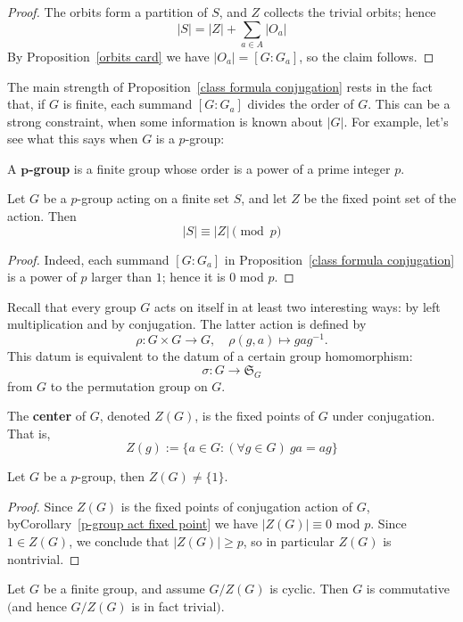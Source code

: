 \begin{proof}
The orbits form a partition of $S$, and $Z$ collects the trivial orbits; hence
\[|S|=|Z|+\sum_{a\in A}|O_a|\]
By Proposition~\ref{orbits card} we have $|O_a|=[G:G_a]$, so the claim follows.
\end{proof}
The main strength of Proposition~\ref{class formula conjugation} rests in the fact that, if $G$ is finite, each summand $[G:G_a]$ divides the order of $G$. This can be a strong constraint, when some information is known about $|G|$. For example, let's see what this says when $G$ is a $p$-group:
\begin{definition}
A \textbf{$\bm{p}$-group} is a finite group whose order is a power of a prime integer $p$.
\end{definition}
\begin{corollary}\label{p-group act fixed point}
Let $G$ be a $p$-group acting on a finite set $S$, and let $Z$ be the fixed
point set of the action. Then
\[|S|\equiv|Z|\pmod{p}\]
\end{corollary}
\begin{proof}
Indeed, each summand $[G:G_a]$ in Proposition~\ref{class formula conjugation} is a power of $p$ larger than $1$; hence it is $0$ mod $p$.
\end{proof}
Recall that every group $G$ acts on itself in at least two interesting ways: by left multiplication and by conjugation. The latter action is defined by
\[\rho:G\times G\to G,\quad \rho(g,a)\mapsto gag^{-1}.\]
This datum is equivalent to the datum of a certain group homomorphism:
\[\sigma:G\to\mathfrak{S}_G\]
from $G$ to the permutation group on $G$.
\begin{definition}
The \textbf{center} of $G$, denoted $Z(G)$, is the fixed points of $G$ under conjugation. That is,
\[Z(g):=\{a\in G:(\forall g\in G)\ ga=ag\}\]
\end{definition}
\begin{corollary}\label{p-group center}
Let $G$ be a $p$-group, then $Z(G)\neq\{1\}$.
\end{corollary}
\begin{proof}
Since $Z(G)$ is the fixed points of conjugation action of $G$, byCorollary~\ref{p-group act fixed point} we have $|Z(G)|\equiv 0$ mod $p$. Since $1\in Z(G)$, we conclude that $|Z(G)|\geq p$, so in particular $Z(G)$ is nontrivial.
\end{proof}
\begin{lemma}\label{center cyclic}
Let $G$ be a finite group, and assume $G/Z(G)$ is cyclic. Then $G$ is
commutative $($and hence $G/Z(G)$ is in fact trivial$)$.
\end{lemma}
